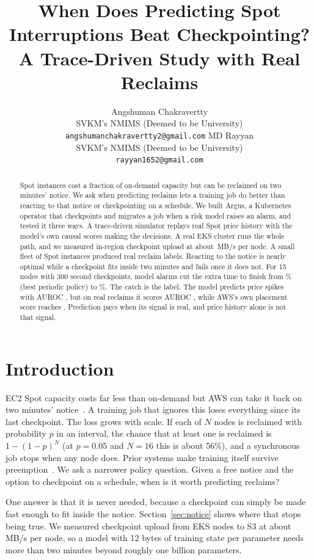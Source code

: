 \documentclass{article}
\title{When Does Predicting Spot Interruptions Beat Checkpointing? A Trace-Driven Study with Real Reclaims}
\author{
  Angshuman Chakravertty\\
  SVKM's NMIMS (Deemed to be University)\\
  \texttt{angshumanchakravertty2@gmail.com}
  \And
  MD Rayyan\\
  SVKM's NMIMS (Deemed to be University)\\
  \texttt{rayyan1652@gmail.com}
}
\begin{document}
\maketitle

\begin{abstract}
Spot instances cost a fraction of on-demand capacity but can be reclaimed on two minutes' notice. We ask when predicting reclaims lets a training job do better than reacting to that notice or checkpointing on a schedule. We built Argus, a Kubernetes operator that checkpoints and migrates a job when a risk model raises an alarm, and tested it three ways. A trace-driven simulator replays real Spot price history with the model's own causal scores making the decisions. A real EKS cluster runs the whole path, and we measured in-region checkpoint upload at about \awsRateMean\,MB/s per node. A small fleet of Spot instances produced real reclaim labels. Reacting to the notice is nearly optimal while a checkpoint fits inside two minutes and fails once it does not. For 15 nodes with 300 second checkpoints, model alarms cut the extra time to finish from \ovYDThreeHundred\% (best periodic policy) to \ovModelThreeHundred\%. The catch is the label. The model predicts price spikes with AUROC \aurocFinal, but on real reclaims it scores AUROC \realAurocPrice, while AWS's own placement score reaches \realAurocPlace. Prediction pays when its signal is real, and price history alone is not that signal.
\end{abstract}

\section{Introduction}
\label{sec:intro}

EC2 Spot capacity costs far less than on-demand but AWS can take it back on two minutes' notice~\citep{aws-spot}. A training job that ignores this loses everything since its last checkpoint. The loss grows with scale. If each of $N$ nodes is reclaimed with probability $p$ in an interval, the chance that at least one is reclaimed is $1-(1-p)^N$ (at $p=0.05$ and $N=16$ this is about 56\%), and a synchronous job stops when any node does. Prior systems make training itself survive preemption~\citep{varuna, bamboo, oobleck}. We ask a narrower policy question. Given a free notice and the option to checkpoint on a schedule, when is it worth predicting reclaims?

One answer is that it is never needed, because a checkpoint can simply be made fast enough to fit inside the notice. Section~\ref{sec:notice} shows where that stops being true. We measured checkpoint upload from EKS nodes to S3 at about \awsRateMean\,MB/s per node, so a model with 12 bytes of training state per parameter needs more than two minutes beyond roughly one billion parameters.
\end{document}

